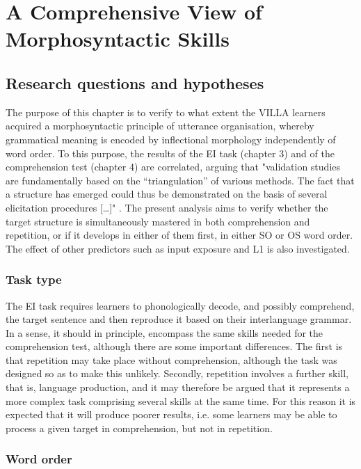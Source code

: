 \chapter{A Comprehensive View of Morphosyntactic Skills}

\section{Research questions and hypotheses}\label{sec:06:1}

The purpose of this chapter is to verify to what extent the VILLA learners acquired a morphosyntactic principle of utterance organisation, whereby grammatical meaning is encoded by inflectional morphology independently of word order. To this purpose, the results of the EI task (chapter 3) and of the comprehension test (chapter 4) are correlated, arguing that "validation studies are fundamentally based on the “triangulation” of various methods. The fact that a structure has emerged could thus be demonstrated on the basis of several elicitation procedures […]" \citep[326]{Pallotti2006}. The present analysis aims to verify whether the target structure is simultaneously mastered in both comprehension and repetition, or if it develops in either of them first, in either SO or OS word order. The effect of other predictors such as input exposure and L1 is also investigated.

\subsection{Task type}\label{sec:06:1.1}

The EI task requires learners to phonologically decode, and possibly comprehend, the target sentence and then reproduce it based on their interlanguage grammar. In a sense, it should in principle, encompass the same skills needed for the comprehension test, although there are some important differences. The first is that repetition may take place without comprehension, although the task was designed so as to make this unlikely. Secondly, repetition involves a further skill, that is, language production, and it may therefore be argued that it represents a more complex task comprising several skills at the same time. For this reason it is expected that it will produce poorer results, i.e. some learners may be able to process a given target in comprehension, but not in repetition.

\subsection{Word order}\label{sec:06:1.2}

